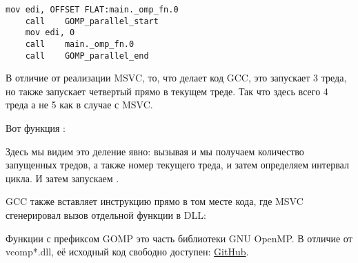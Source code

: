 \begin{lstlisting}[caption=GCC 4.8.1,style=customasm]
	mov	edi, OFFSET FLAT:main._omp_fn.0
	call	GOMP_parallel_start
	mov	edi, 0
	call	main._omp_fn.0
	call	GOMP_parallel_end
\end{lstlisting}

В отличие от реализации MSVC, то, что делает код GCC, это запускает 3 треда, но также запускает 
четвертый прямо в текущем треде. Так что здесь всего 4 треда а не 5 как в случае
с MSVC.

Вот функция :
 


Здесь мы видим это деление явно: вызывая 
 и 
мы получаем количество запущенных тредов, а также номер текущего треда, и затем определяем интервал цикла.
И затем запускаем .

GCC также вставляет инструкцию  
прямо в том месте кода, где MSVC сгенерировал вызов отдельной функции в DLL:



Функции с префиксом GOMP это часть библиотеки 
GNU OpenMP.
В отличие от vcomp*.dll, её исходный код свободно доступен: 
\href{http://go.yurichev.com/17102}{GitHub}.

